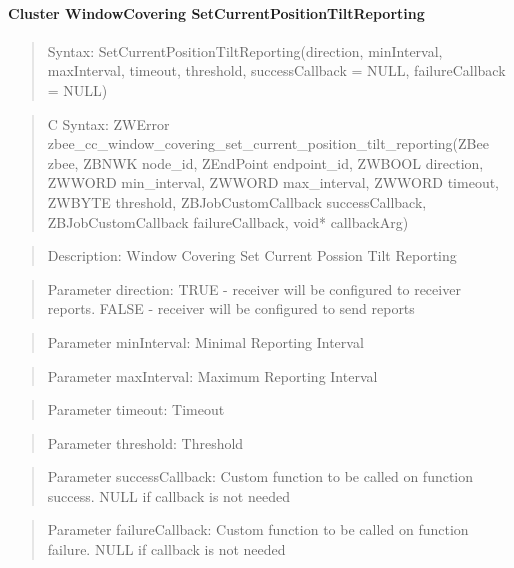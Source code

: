 \paragraph{Cluster WindowCovering SetCurrentPositionTiltReporting}
\begin{quote}Syntax: SetCurrentPositionTiltReporting(direction, minInterval, maxInterval, timeout, threshold, successCallback = NULL, failureCallback = NULL)\end{quote}
\begin{quote}C Syntax: ZWError zbee\_cc\_window\_covering\_set\_current\_position\_tilt\_reporting(ZBee zbee, ZBNWK node\_id, ZEndPoint endpoint\_id, ZWBOOL direction, ZWWORD min\_interval, ZWWORD max\_interval, ZWWORD timeout, ZWBYTE threshold, ZBJobCustomCallback successCallback, ZBJobCustomCallback failureCallback, void* callbackArg)\end{quote}
\begin{quote}Description: Window Covering Set Current Possion Tilt Reporting\end{quote}
\begin{quote}Parameter direction: TRUE  - receiver will be configured to receiver reports. FALSE - receiver will be configured to send reports\end{quote}
\begin{quote}Parameter minInterval: Minimal Reporting Interval\end{quote}
\begin{quote}Parameter maxInterval: Maximum Reporting Interval\end{quote}
\begin{quote}Parameter timeout: Timeout\end{quote}
\begin{quote}Parameter threshold: Threshold\end{quote}
\begin{quote}Parameter successCallback: Custom function to be called on function success. NULL if callback is not needed\end{quote}
\begin{quote}Parameter failureCallback: Custom function to be called on function failure. NULL if callback is not needed\end{quote}


